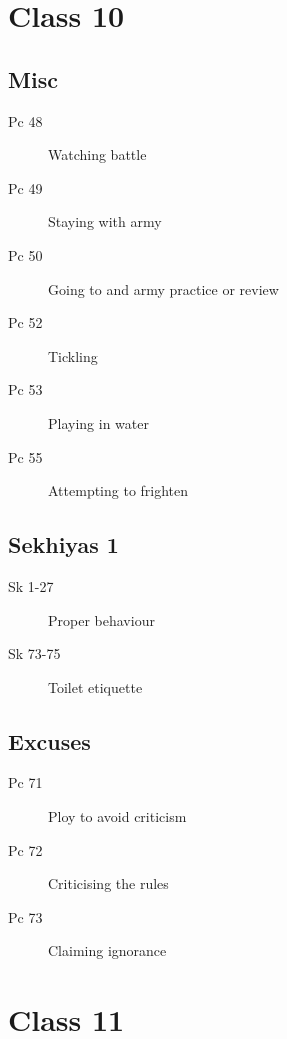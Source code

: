 \documentclass[11pt,oneside]{memoir}
\begin{document}
\clearpage

\chapter{Class 10}

\begin{multicols}{2}

\section{Misc}

\begin{description}
\item[Pc 48] Watching battle
\item[Pc 49] Staying with army
\item[Pc 50 \orig] Going to and army practice or review%
\item[Pc 52 \orig] Tickling%
\item[Pc 53] Playing in water
\item[Pc 55] Attempting to frighten
\end{description}

\columnbreak

\section{Sekhiyas 1}

\begin{description}
\item[Sk 1-27] Proper behaviour
\item[Sk 73-75] Toilet etiquette
\end{description}

\section{Excuses}

\begin{description}
\item[Pc 71] Ploy to avoid criticism
\item[Pc 72 \orig] Criticising the rules%
\item[Pc 73] Claiming ignorance
\end{description}

\end{multicols}

\chapter{Class 11}
\end{document}
